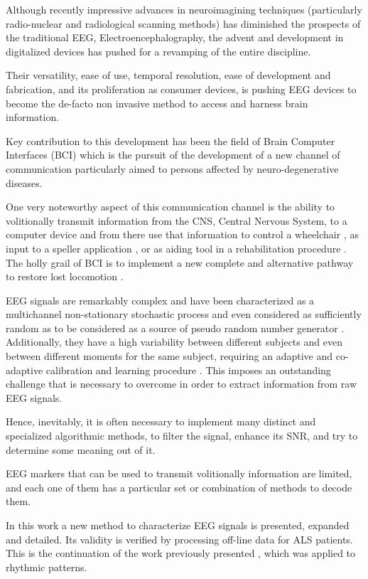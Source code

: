 \documentclass[entropy,article,submit,moreauthors,pdftex,10pt,a4paper]{mdpi}
\begin{document}
Although recently impressive advances in neuroimagining techniques (particularly radio-nuclear and radiological scanning methods) \citep{Schomer2010} has diminished the prospects of the traditional EEG, Electroencephalography, the advent and development in digitalized devices has pushed for a revamping of the entire discipline.

Their versatility, ease of use, temporal resolution, ease of development and fabrication, and its proliferation as consumer devices, is pushing EEG devices to become the de-facto non invasive method to access and harness brain information.

Key contribution to this development has been the field of Brain Computer Interfaces (BCI) \citep{Wolpaw Seminar paper} which is the pursuit of the development of a new channel of communication particularly aimed to persons affected by neuro-degenerative  diseases.

One very noteworthy aspect of this communication channel is the ability to volitionally transmit information from the CNS, Central Nervous System, to a computer device and from there use that information to control a wheelchair \citep{Carlson2013}, as input to a speller application \citep{Guger2009a}, or as aiding tool in a rehabilitation procedure \citep{Jure2016}.  The holly grail of BCI is to implement a new complete and alternative pathway to restore lost locomotion \citep{WolpawJonathanR2012}.

EEG signals are remarkably complex and have been characterized as a multichannel non-stationary stochastic process and even considered as sufficiently random as to be considered as a source of pseudo random number generator \citep{Chen2014}. Additionally, they have a high variability between different subjects and even between different moments for the same subject, requiring an adaptive and co-adaptive calibration and learning procedure \citep{Clerc}.  This imposes an outstanding challenge that is necessary to overcome in order to extract information from raw EEG signals.

Hence, inevitably, it is often necessary to implement many distinct and specialized algorithmic methods, to filter the signal, enhance its SNR, and try to determine some meaning out of it.  

EEG markers \citep{Clerc} that can be used to transmit volitionally information are limited, and each one of them has a particular set or combination of methods to decode them. 

In this work a new method to characterize EEG signals is presented, expanded and detailed.  Its validity is verified by processing off-line data for ALS patients.  This is the continuation of the work previously presented \citep{Ramele2016}, which was applied to rhythmic patterns.
\end{document}
